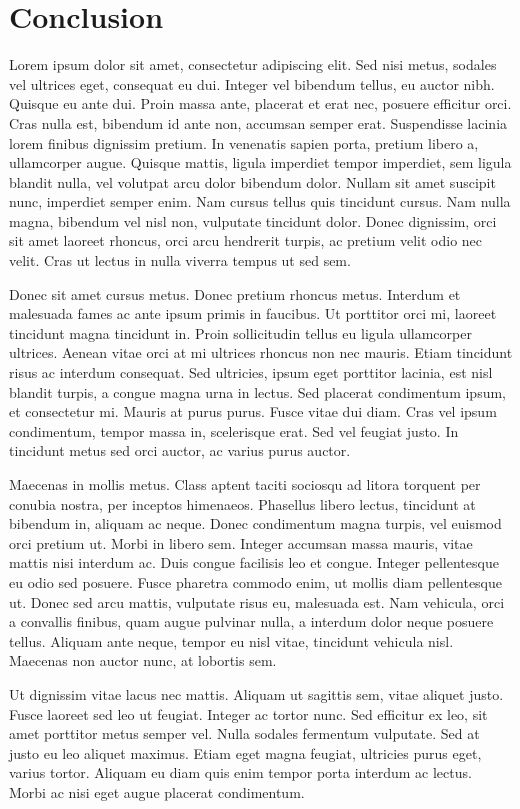 \chapter{Conclusion}\label{chap:conclusion}

Lorem ipsum dolor sit amet, consectetur adipiscing elit. Sed nisi metus, sodales
vel ultrices eget, consequat eu dui. Integer vel bibendum tellus, eu auctor
nibh. Quisque eu ante dui. Proin massa ante, placerat et erat nec, posuere
efficitur orci. Cras nulla est, bibendum id ante non, accumsan semper erat.
Suspendisse lacinia lorem finibus dignissim pretium. In venenatis sapien porta,
pretium libero a, ullamcorper augue. Quisque mattis, ligula imperdiet tempor
imperdiet, sem ligula blandit nulla, vel volutpat arcu dolor bibendum dolor.
Nullam sit amet suscipit nunc, imperdiet semper enim. Nam cursus tellus quis
tincidunt cursus. Nam nulla magna, bibendum vel nisl non, vulputate tincidunt
dolor. Donec dignissim, orci sit amet laoreet rhoncus, orci arcu hendrerit
turpis, ac pretium velit odio nec velit. Cras ut lectus in nulla viverra tempus
ut sed sem.

Donec sit amet cursus metus. Donec pretium rhoncus metus. Interdum et malesuada
fames ac ante ipsum primis in faucibus. Ut porttitor orci mi, laoreet tincidunt
magna tincidunt in. Proin sollicitudin tellus eu ligula ullamcorper ultrices.
Aenean vitae orci at mi ultrices rhoncus non nec mauris. Etiam tincidunt risus
ac interdum consequat. Sed ultricies, ipsum eget porttitor lacinia, est nisl
blandit turpis, a congue magna urna in lectus. Sed placerat condimentum ipsum,
et consectetur mi. Mauris at purus purus. Fusce vitae dui diam. Cras vel ipsum
condimentum, tempor massa in, scelerisque erat. Sed vel feugiat justo. In
tincidunt metus sed orci auctor, ac varius purus auctor.

Maecenas in mollis metus. Class aptent taciti sociosqu ad litora torquent per
conubia nostra, per inceptos himenaeos. Phasellus libero lectus, tincidunt at
bibendum in, aliquam ac neque. Donec condimentum magna turpis, vel euismod orci
pretium ut. Morbi in libero sem. Integer accumsan massa mauris, vitae mattis
nisi interdum ac. Duis congue facilisis leo et congue. Integer pellentesque eu
odio sed posuere. Fusce pharetra commodo enim, ut mollis diam pellentesque ut.
Donec sed arcu mattis, vulputate risus eu, malesuada est. Nam vehicula, orci a
convallis finibus, quam augue pulvinar nulla, a interdum dolor neque posuere
tellus. Aliquam ante neque, tempor eu nisl vitae, tincidunt vehicula nisl.
Maecenas non auctor nunc, at lobortis sem.

Ut dignissim vitae lacus nec mattis. Aliquam ut sagittis sem, vitae aliquet
justo. Fusce laoreet sed leo ut feugiat. Integer ac tortor nunc. Sed efficitur
ex leo, sit amet porttitor metus semper vel. Nulla sodales fermentum vulputate.
Sed at justo eu leo aliquet maximus. Etiam eget magna feugiat, ultricies purus
eget, varius tortor. Aliquam eu diam quis enim tempor porta interdum ac lectus.
Morbi ac nisi eget augue placerat condimentum.

